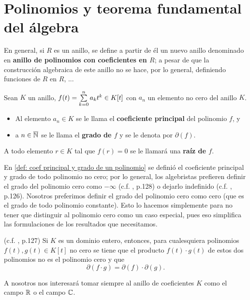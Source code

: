 \section{Polinomios y teorema fundamental del álgebra}

En general, si $R$ es un anillo, se define a partir de 
él un nuevo anillo denominado en \textbf{anillo de polinomios
con coeficientes en $R$}; a pesar de que la construcción
algebraica de este anillo no se hace, por lo general, definiendo
funciones de $R$ en $R$, ...


\begin{defi}
\label{def: coef principal y grado de un polinomio}
Sean $K$ un anillo, $f(t)= \sum\limits_{k=0}^{n}a_{k}t^{k} \in K[t]$
con $a_{n}$ un elemento no cero del anillo $K$.
\begin{itemize}
\item Al elemento $a_{n} \in K$ se le llama el \textbf{coeficiente
principal} del polinomio $f$, y
\item a $n \in \overline{\mathbb{N}}$ se le llama el \textbf{grado de $f$}
y se le denota por $\partial(f)$.
\end{itemize}
A todo elemento $r \in K$ tal que $f(r)=0$ se le llamará 
una \textbf{raíz de $f$}. 
\end{defi}


\begin{nota}
En \ref{def: coef principal y grado de un polinomio} se definió
el coeficiente principal y grado de todo polinomio no cero; 
por lo general, los algebristas prefieren definir el grado del 
polinomio cero como $-\infty$
(c.f. \cite{jacobson}, p.128) 
o dejarlo indefinido (c.f. \cite{rotman}, p.126).
Nosotros preferimos definir el grado del polinomio cero como
cero (que es el grado de todo polinomio constante). Esto lo hacemos
simplemente para no tener que distinguir al polinomio
cero como un caso especial, pues eso simplifica las formulaciones
de los resultados que necesitamos.
\end{nota}


\begin{prop}
\label{prop: grado producto polin}
(c.f. \cite{rotman}, p.127)
Si $K$ es un dominio entero, entonces, para cualesquiera
polinomios $f(t), g(t) \in K[t]$ no cero se tiene que
el producto $f(t) \cdot g(t)$ de estos dos polinomios no
es el polinomio cero y que
\[
\partial(f \cdot g) = \partial(f) \cdot \partial(g).
\]
\end{prop}

A nosotros nos interesará tomar siempre al anillo
de coeficientes $K$ como el campo $\mathbb{R}$ o el campo $\mathbb{C}$.

